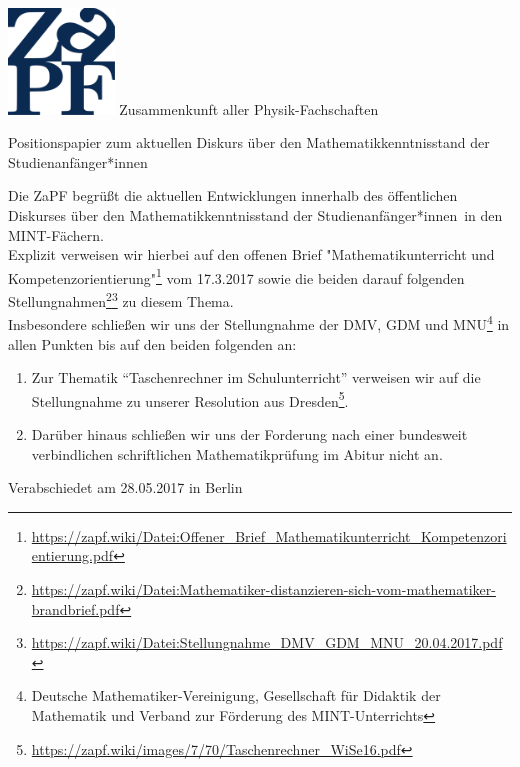 \documentclass[DIV=calc]{scrartcl}
\newcommand{\gen}{*innen}
\begin{document}
    \hspace{0.87\textwidth}
    \begin{minipage}{120pt}
        \vspace{-1.8cm}
        \includegraphics[width=80pt]{logo.pdf}
        \centering
        \small Zusammenkunft aller Physik-Fachschaften
    \end{minipage}
    \begin{center}
        \huge{Positionspapier zum aktuellen Diskurs über den Mathematikkenntnisstand der
Studienanfänger\gen} \\
        \normalsize
    \end{center}
    \vspace{1cm}    
Die ZaPF begrüßt die aktuellen Entwicklungen innerhalb des öffentlichen Diskurses über den Mathematikkenntnisstand der Studienanfänger\gen\ in den MINT-Fächern.\\
Explizit verweisen wir hierbei auf den offenen Brief "Mathematikunterricht und Kompetenzorientierung"\footnote{\href{https://zapf.wiki/Datei:Offener_Brief_Mathematikunterricht_Kompetenzorientierung.pdf}{https://zapf.wiki/Datei:Offener\_Brief\_Mathematikunterricht\_Kompetenzorientierung.pdf}} vom 17.3.2017 sowie die beiden darauf folgenden Stellungnahmen\footnote{\href{https://zapf.wiki/Datei:Mathematiker-distanzieren-sich-vom-mathematiker-brandbrief.pdf}{https://zapf.wiki/Datei:Mathematiker-distanzieren-sich-vom-mathematiker-brandbrief.pdf}}\footnote{\href{https://zapf.wiki/Datei:Stellungnahme_DMV_GDM_MNU_20.04.2017.pdf}{https://zapf.wiki/Datei:Stellungnahme\_DMV\_GDM\_MNU\_20.04.2017.pdf}} zu diesem Thema.\\
Insbesondere schließen wir uns der Stellungnahme der DMV, GDM und MNU\footnote{Deutsche Mathematiker-Vereinigung, Gesellschaft für Didaktik der Mathematik und Verband zur Förderung des MINT-Unterrichts} in allen Punkten bis auf den beiden folgenden an:
\begin{enumerate}
\item Zur Thematik "`Taschenrechner im Schulunterricht"' verweisen wir auf die Stellungnahme zu unserer Resolution aus Dresden\footnote{\href{https://zapf.wiki/images/7/70/Taschenrechner_WiSe16.pdf}{https://zapf.wiki/images/7/70/Taschenrechner\_WiSe16.pdf}}.
\item Darüber hinaus schließen wir uns der Forderung nach einer bundesweit verbindlichen schriftlichen Mathematikprüfung im Abitur nicht an.
\end{enumerate}

\vfill
    \begin{flushright}
        Verabschiedet am 28.05.2017 in Berlin
    \end{flushright}
\end{document}

